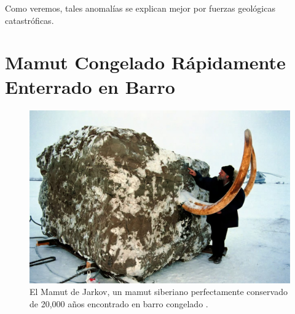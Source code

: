 \documentclass[10pt,twocolumn,letterpaper]{article}
\begin{document}
Como veremos, tales anomalías se explican mejor por fuerzas geológicas catastróficas.

\section{Mamut Congelado Rápidamente Enterrado en Barro}

\begin{figure}[t]
\begin{center}
   \includegraphics[width=1\linewidth]{jarkov-mammoth.jpg}
\end{center}
   \caption{El Mamut de Jarkov, un mamut siberiano perfectamente conservado de 20,000 años encontrado en barro congelado \cite{51}.}
\label{fig:1}
\label{fig:onecol}
\end{figure}
\end{document}
